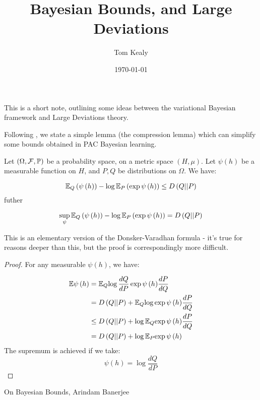 \documentclass{article}
\newcommand{\mf}{\psi\left(h\right)}
\begin{document}
\nocite{*}
\title{Bayesian Bounds, and Large Deviations}
\date{\today}
\author{Tom Kealy}
\maketitle

This is a short note, outlining some ideas between the variational Bayesian framework and Large Deviations theory. 

Following \cite{Banerjee}, we state a simple lemma (the compression lemma) which can simplify some bounds obtained in PAC Bayesian learning.

\begin{lemma}
Let \(\left(\Omega, \mathcal{F}, {\mathbb{P}}\right)\) be a probability space, on a metric space \(\left(H, \mu\right)\). Let \(\psi\left(h\right)\) be a measurable function on \(H\), and \(P,Q\) be distributions on \(\Omega\). We have:

\begin{equation}
\ep_{Q} \left(\mf \right) - \log{\ep_{P} \left(\exp{\mf }\right)} \leq D\left(Q||P\right)
\end{equation}
futher

\begin{equation}
\sup_{\psi}{\ep_{Q} \left(\mf \right) - \log{\ep_{P} \left(\exp{\mf }\right)}} = D\left(Q||P\right)
\end{equation}
\end{lemma}
This is an elementary version of the Donsker-Varadhan formula - it's true for reasons deeper than this, but the proof is correspondingly more difficult. 
\begin{proof}
For any measurable \(\mf \), we have: 

\begin{align}
\ep{\mf} &= \ep_Q{\log{\frac{dQ}{dP} \exp{\mf} \frac{dP}{dQ} }}
\\& = D\left(Q||P\right) + \ep_Q{\log{\exp{\mf} \frac{dP}{dQ} }} 
\\& \leq D\left(Q||P\right) + \log{\ep_Q{\exp{\mf} \frac{dP}{dQ} }}
\\& = D\left(Q||P\right) + \log{\ep_P{\exp{\mf}}}
\end{align}
The supremum is achieved if we take:
\begin{equation}
\mf = \log{\frac{dQ}{dP}}
\end{equation}

\end{proof}
\begin{thebibliography}{9}

  On Bayesian Bounds,
  Arindam Banerjee

\end{thebibliography}  
\end{document}
